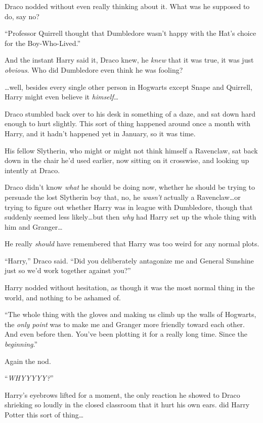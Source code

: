Draco nodded without even really thinking about it. What was he supposed to do, say no?

“Professor Quirrell thought that Dumbledore wasn’t happy with the Hat’s choice for the Boy-Who-Lived.”

And the instant Harry said it, Draco knew, he \emph{knew} that it was true, it was just \emph{obvious}. Who did Dumbledore even think he was fooling?

…well, besides every single other person in Hogwarts except Snape and Quirrell, Harry might even believe it \emph{himself}…

Draco stumbled back over to his desk in something of a daze, and sat down hard enough to hurt slightly. This sort of thing happened around once a month with Harry, and it hadn’t happened yet in January, so it was time.

His fellow Slytherin, who might or might not think himself a Ravenclaw, sat back down in the chair he’d used earlier, now sitting on it crosswise, and looking up intently at Draco.

Draco didn’t know \emph{what} he should be doing now, whether he should be trying to persuade the lost Slytherin boy that, no, he \emph{wasn’t} actually a Ravenclaw…or trying to figure out whether Harry was in league with Dumbledore, though that suddenly seemed less likely…but then \emph{why} had Harry set up the whole thing with him and Granger…

He really \emph{should} have remembered that Harry was too weird for any normal plots.

“Harry,” Draco said. “Did you deliberately antagonize me and General Sunshine just so we’d work together against you?”

Harry nodded without hesitation, as though it was the most normal thing in the world, and nothing to be ashamed of.

“The whole thing with the gloves and making us climb up the walls of Hogwarts, the \emph{only point} was to make me and Granger more friendly toward each other. And even before then. You’ve been plotting it for a really long time. Since the \emph{beginning}.”

Again the nod.

“\emph{WHYYYYY?}”

Harry’s eyebrows lifted for a moment, the only reaction he showed to Draco shrieking so loudly in the closed classroom that it hurt his own ears.  did Harry Potter  this sort of thing…

